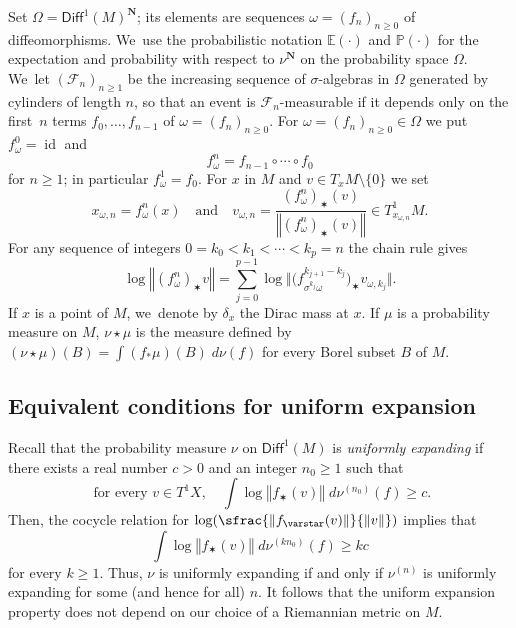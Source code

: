 \documentclass[JEP,XML,SOM,Unicode,published]{cedram}
\newcommand{\Psfrac}[2]{(\sfrac{#1}{#2})}
\newcommand{\norm}[1]{{\left\Vert#1\right\Vert}}
\newcommand{\bnorm}[1]{{\bigl\Vert#1\bigr\Vert}}
\newcommand{\blrpar}[1]{\bigl(#1\bigr)}
\DeclareMathOperator{\id}{id}
\newcommand{\ee}{\mathbb{E}}
\newcommand{\pp}{\mathbb{P}}\let\P\pp
\def\N{\mathbf{N}}
\newcommand\Diff{{\mathsf{Diff}}}
\theoremstyle{plain}
\theoremstyle{definition}
\begin{document}
Set $\Omega=\Diff^1(M)^\N$; its elements
are sequences $\omega = (f_n)_{n\geq 0}$ of diffeomorphisms. We~use the
probabilistic notation $\ee(\cdot)$ and $\pp(\cdot)$ for the expectation and probability with respect to $\nu^\N$
on the probability space $\Omega$. We~let
$(\mathcal F_n)_{n\geq 1}$ be the increasing sequence of $\sigma$-algebras in $\Omega$
generated by cylinders of length $n$, so that an event is $\mathcal F_n$-measurable if it depends only on
the first~$n$ terms $f_0, \ldots , f_{n-1}$ of $\omega=(f_n)_{n\geq 0}$.
For $\omega = (f_n)_{n\geq 0} \in \Omega$ we put $f^0_\omega=\id$ and
\begin{equation*}
f_\omega^n = f_{n-1}\circ \cdots \circ f_0
\end{equation*}
for $n\geq 1$; in particular $f_\omega^1 = f_0$. For $x$ in $M$ and $ v \in T_xM\setminus\{ 0\}$ we set
\begin{equation*}
x_{\omega, n} = f_\omega^n(x) \quad {\text{and}} \quad
v_{\omega, n} = \frac{ (f_\omega^n)_\varstar (v)} {\norm{ (f_\omega^n)_\varstar (v)}}\in T^1_{x_{\omega, n}}M.
\end{equation*}
For any sequence of integers
$0= k_0< k_1< \cdots < k_p = n$ the chain rule gives
\begin{equation}\label{eq:chain_rule}
\log\norm{(f_\omega^n)_\varstar v} = \sum_{j=0}^{p-1} \log \bnorm{ \blrpar{f^{k_{j+1}- k_j}_{\sigma^{k_j}\omega}}_\varstar { v_{\omega, k_j}}} .
\end{equation}
If $x$ is a point of $M$, we~denote by $\delta_x$ the Dirac mass at $x$. If $\mu$ is a probability measure on $M$, $\nu\star\mu$
is the measure defined by $(\nu\star\mu)(B)=\int (f_*\mu)(B) \; d\nu(f)$ for every Borel subset $B$ of $M$.

\subsection{Equivalent conditions for uniform expansion}

Recall that the probability measure $\nu$ on $\Diff^1(M)$ is \emph{uniformly expanding}
if there exists a real number $c>0$ and an integer $n_0\geq 1$ such that
\begin{equation}\label{eq:UEbisrepetita}
\text{ for every } v\in T^1X, \quad
\int \log {\norm{ f_\varstar ( v)}} \; d\nu^{(n_0)} (f) \geq c.
\end{equation}
Then, the cocycle relation for
$ \log \Psfrac{\norm{ f_\varstar ( v)}}{\norm{ v}}$ implies that
\begin{equation}\label{eq:UE_iteree}
\int \log {\norm{ f_\varstar ( v)}} \; d\nu^{(kn_0)}(f) \geq kc
\end{equation}
for every $k\geq 1$. Thus, $\nu$ is uniformly expanding if and only if
$\nu^{(n)}$ is uniformly expanding for some (and hence for all) $n$. It follows that the uniform expansion property
does not depend on our choice of a Riemannian metric on $M$.
\end{document}
